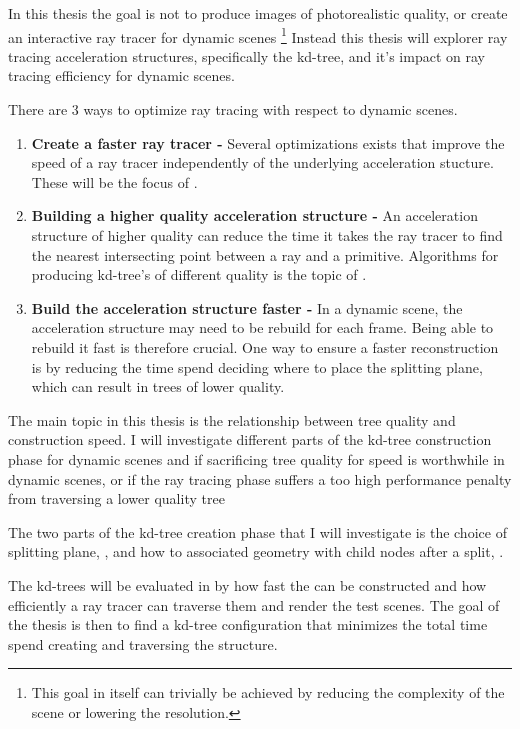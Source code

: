 In this thesis the goal is not to produce images of photorealistic
quality, or create an interactive ray tracer for dynamic
scenes \footnote{This goal in itself can trivially be achieved by
  reducing the complexity of the scene or lowering the resolution.}
Instead this thesis will explorer ray tracing acceleration structures,
specifically the kd-tree, and it's impact on ray tracing efficiency
for dynamic scenes.

There are 3 ways to optimize ray tracing with respect to dynamic
scenes. 

\begin{enumerate}
  \item \textbf{Create a faster ray tracer -} Several optimizations
    exists that improve the speed of a ray tracer independently of the
    underlying acceleration stucture. These will be the focus of
    .
  \item \textbf{Building a higher quality acceleration structure -} An
    acceleration structure of higher quality can reduce the time it
    takes the ray tracer to find the nearest intersecting point
    between a ray and a primitive. Algorithms for producing kd-tree's
    of different quality is the topic of
    .
  \item \textbf{Build the acceleration structure faster -} In a
    dynamic scene, the acceleration structure may need to be rebuild
    for each frame. Being able to rebuild it fast is therefore
    crucial. One way to ensure a faster reconstruction is by reducing
    the time spend deciding where to place the splitting plane, which
    can result in trees of lower quality.
\end{enumerate}

The main topic in this thesis is the relationship between tree quality
and construction speed. I will investigate different parts of the
kd-tree construction phase for dynamic scenes and if sacrificing tree
quality for speed is worthwhile in dynamic scenes, or if the ray
tracing phase suffers a too high performance penalty from traversing a
lower quality tree

The two parts of the kd-tree creation phase that I will investigate is
the choice of splitting plane, , and
how to associated geometry with child nodes after a split,
.

The kd-trees will be evaluated in  by how fast
the can be constructed and how efficiently a ray tracer can traverse
them and render the test scenes. The goal of the thesis is then to
find a kd-tree configuration that minimizes the total time spend
creating and traversing the structure.

